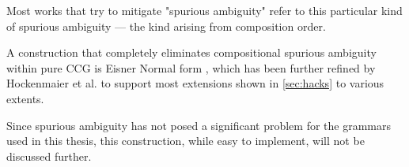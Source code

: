 \documentclass[main.tex]{subfiles}
\begin{document}
Most works that try to mitigate "spurious ambiguity" refer to this particular
kind of spurious ambiguity --- the kind arising from composition order.

A construction that completely eliminates compositional spurious ambiguity
within pure CCG is Eisner Normal form \cite{eisner}, which has been further
refined by Hockenmaier et al. \cite{julia} to support most extensions shown
in \cref{sec:hacks} to various extents.

Since spurious ambiguity has not posed a significant problem for the grammars used
in this thesis, this construction, while easy to implement, will not be
discussed further.
\end{document}
